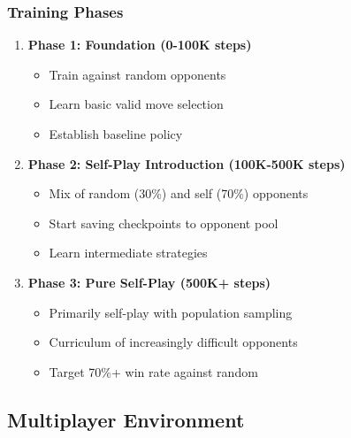 \documentclass[12pt,a4paper]{article}
\begin{document}
\subsubsection{Training Phases}
\begin{enumerate}
    \item \textbf{Phase 1: Foundation (0-100K steps)}
    \begin{itemize}
        \item Train against random opponents
        \item Learn basic valid move selection
        \item Establish baseline policy
    \end{itemize}
   
    \item \textbf{Phase 2: Self-Play Introduction (100K-500K steps)}
    \begin{itemize}
        \item Mix of random (30\%) and self (70\%) opponents
        \item Start saving checkpoints to opponent pool
        \item Learn intermediate strategies
    \end{itemize}
   
    \item \textbf{Phase 3: Pure Self-Play (500K+ steps)}
    \begin{itemize}
        \item Primarily self-play with population sampling
        \item Curriculum of increasingly difficult opponents
        \item Target 70\%+ win rate against random
    \end{itemize}
\end{enumerate}

\newpage
\subsection{Multiplayer Environment}
\end{document}
